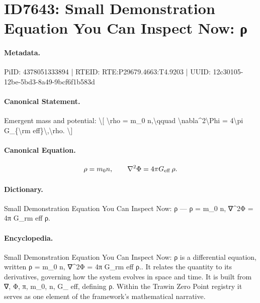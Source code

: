 \section*{ID7643: Small Demonstration Equation You Can Inspect Now: ρ}
\paragraph{Metadata.}
PiID: 4378051333894 | RTEID: RTE:P29679.4663:T4.9203 | UUID: 12c30105-12be-5bd3-8a49-9bcf6f1b583d

\paragraph{Canonical Statement.}
Emergent mass and potential: \textbackslash{}[ \textbackslash{}rho = m\_0 n,\textbackslash{}qquad \textbackslash{}nabla\textasciicircum{}2\textbackslash{}Phi = 4\textbackslash{}pi G\_\{\textbackslash{}rm eff\}\textbackslash{},\textbackslash{}rho. \textbackslash{}]

\paragraph{Canonical Equation.}
\[
\rho = m_0 n,\qquad \nabla^2\Phi = 4\pi G_{\rm eff}\,\rho.
\]

\paragraph{Dictionary.}
Small Demonstration Equation You Can Inspect Now: ρ — ρ = m\_0 n, ∇\textasciicircum{}2Φ = 4π G\_rm eff ρ.

\paragraph{Encyclopedia.}
Small Demonstration Equation You Can Inspect Now: ρ is a differential equation, written ρ = m\_0 n, ∇\textasciicircum{}2Φ = 4π G\_rm eff ρ.. It relates the quantity to its derivatives, governing how the system evolves in space and time. It is built from ∇, Φ, π, m\_0, n, G\_ eff, defining ρ. Within the Trawin Zero Point registry it serves as one element of the framework's mathematical narrative.

